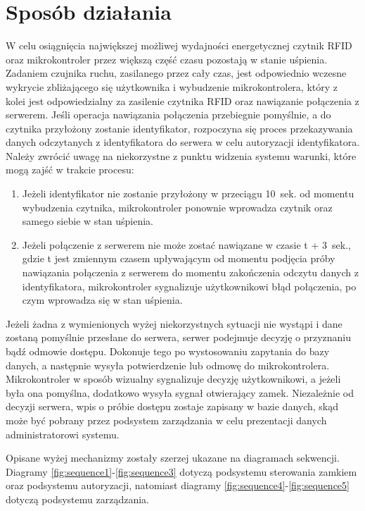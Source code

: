         \section{Sposób działania}
            W celu osiągnięcia największej możliwej wydajności energetycznej czytnik RFID oraz mikrokontroler przez większą część czasu pozostają w stanie uśpienia. Zadaniem czujnika ruchu, zasilanego przez cały czas, jest odpowiednio wczesne wykrycie zbliżającego się użytkownika i wybudzenie mikrokontrolera, który z kolei jest odpowiedzialny za zasilenie czytnika RFID oraz nawiązanie połączenia z serwerem. Jeśli operacja nawiązania połączenia przebiegnie pomyślnie, a do czytnika przyłożony zostanie identyfikator, rozpoczyna się proces przekazywania danych odczytanych z identyfikatora do serwera w celu autoryzacji identyfikatora. Należy zwrócić uwagę na niekorzystne z punktu widzenia systemu warunki, które mogą zajść w trakcie procesu:

            \begin{enumerate}
                \item
                    Jeżeli identyfikator nie zostanie przyłożony w przeciągu 10~sek. od momentu wybudzenia czytnika, mikrokontroler ponownie wprowadza czytnik oraz samego siebie w stan uśpienia.
                \item
                    Jeżeli połączenie z serwerem nie może zostać nawiązane w czasie t + 3~sek., gdzie t jest zmiennym czasem upływającym od momentu podjęcia próby nawiązania połączenia z serwerem do momentu zakończenia odczytu danych z identyfikatora, mikrokontroler sygnalizuje użytkownikowi błąd połączenia, po czym wprowadza się w stan uśpienia.
            \end{enumerate}

            Jeżeli żadna z wymienionych wyżej niekorzystnych sytuacji nie wystąpi i dane zostaną pomyślnie przesłane do serwera, serwer podejmuje decyzję o przyznaniu bądź odmowie dostępu. Dokonuje tego po wystosowaniu zapytania do bazy danych, a następnie wysyła potwierdzenie lub odmowę do mikrokontrolera. Mikrokontroler w sposób wizualny sygnalizuje decyzję użytkownikowi, a jeżeli była ona pomyślna, dodatkowo wysyła sygnał otwierający zamek. Niezależnie od decyzji serwera, wpis o próbie dostępu zostaje zapisany w bazie danych, skąd może być pobrany przez podsystem zarządzania w celu prezentacji danych administratorowi systemu.

            Opisane wyżej mechanizmy zostały szerzej ukazane na diagramach sekwencji. Diagramy \ref{fig:sequence1}-\ref{fig:sequence3} dotyczą podsystemu sterowania zamkiem oraz podsystemu autoryzacji, natomiast diagramy \ref{fig:sequence4}-\ref{fig:sequence5} dotyczą podsystemu zarządzania.

